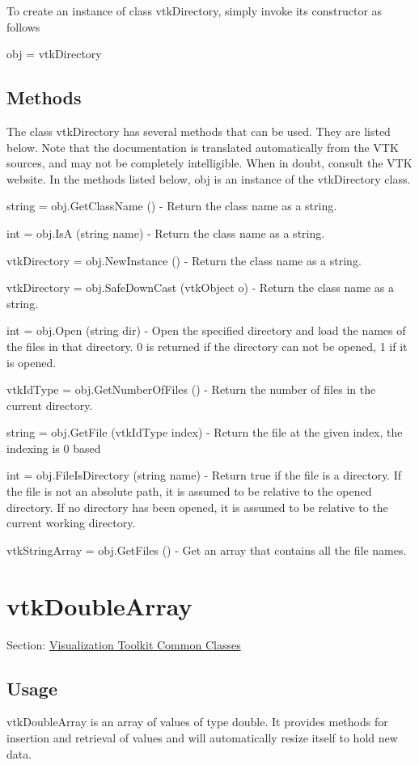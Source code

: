 To create an instance of class vtk\-Directory, simply invoke its constructor as follows \begin{DoxyVerb}  obj = vtkDirectory
\end{DoxyVerb}
 \hypertarget{vtkwidgets_vtkxyplotwidget_Methods}{}\subsection{Methods}\label{vtkwidgets_vtkxyplotwidget_Methods}
The class vtk\-Directory has several methods that can be used. They are listed below. Note that the documentation is translated automatically from the V\-T\-K sources, and may not be completely intelligible. When in doubt, consult the V\-T\-K website. In the methods listed below, {\ttfamily obj} is an instance of the vtk\-Directory class. 
\begin{DoxyItemize}
\item {\ttfamily string = obj.\-Get\-Class\-Name ()} -\/ Return the class name as a string.  
\item {\ttfamily int = obj.\-Is\-A (string name)} -\/ Return the class name as a string.  
\item {\ttfamily vtk\-Directory = obj.\-New\-Instance ()} -\/ Return the class name as a string.  
\item {\ttfamily vtk\-Directory = obj.\-Safe\-Down\-Cast (vtk\-Object o)} -\/ Return the class name as a string.  
\item {\ttfamily int = obj.\-Open (string dir)} -\/ Open the specified directory and load the names of the files in that directory. 0 is returned if the directory can not be opened, 1 if it is opened.  
\item {\ttfamily vtk\-Id\-Type = obj.\-Get\-Number\-Of\-Files ()} -\/ Return the number of files in the current directory.  
\item {\ttfamily string = obj.\-Get\-File (vtk\-Id\-Type index)} -\/ Return the file at the given index, the indexing is 0 based  
\item {\ttfamily int = obj.\-File\-Is\-Directory (string name)} -\/ Return true if the file is a directory. If the file is not an absolute path, it is assumed to be relative to the opened directory. If no directory has been opened, it is assumed to be relative to the current working directory.  
\item {\ttfamily vtk\-String\-Array = obj.\-Get\-Files ()} -\/ Get an array that contains all the file names.  
\end{DoxyItemize}\hypertarget{vtkcommon_vtkdoublearray}{}\section{vtk\-Double\-Array}\label{vtkcommon_vtkdoublearray}
Section\-: \hyperlink{sec_vtkcommon}{Visualization Toolkit Common Classes} \hypertarget{vtkwidgets_vtkxyplotwidget_Usage}{}\subsection{Usage}\label{vtkwidgets_vtkxyplotwidget_Usage}
vtk\-Double\-Array is an array of values of type double. It provides methods for insertion and retrieval of values and will automatically resize itself to hold new data.

